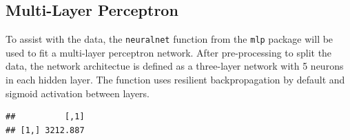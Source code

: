 
\subsection{Multi-Layer Perceptron}

To assist with the data, the \texttt{neuralnet} function from the \texttt{mlp} package will be used to fit a multi-layer perceptron network.  After pre-processing to split the data, the network architectue is defined as a three-layer network with 5 neurons in each hidden layer.  The function uses resilient backpropagation by default and sigmoid activation between layers.

\begin{Shaded}
\begin{Highlighting}[]
\NormalTok{(}\NormalTok{)}

\OtherTok{\textless{}{-}}\NormalTok{ earthquakes\_log[}\NormalTok{(}\NormalTok{(earthquakes\_log)), ]}

\OtherTok{\textless{}{-}}  \SpecialCharTok{*} 
\OtherTok{\textless{}{-}}\NormalTok{ df[}\SpecialCharTok{:}\NormalTok{train\_test\_split,]}
\OtherTok{\textless{}{-}}\NormalTok{ df[(train\_test\_split}\SpecialCharTok{+}\NormalTok{)}\SpecialCharTok{:} \NormalTok{(df),]}

\OtherTok{\textless{}{-}} \SpecialCharTok{\textasciitilde{}}
                  \NormalTok{,}
                  \NormalTok{(}\NormalTok{,}\NormalTok{))}

\OtherTok{\textless{}{-}}  \NormalTok{(} \NormalTok{))}
\SpecialCharTok{/}\SpecialCharTok{\^{}}
\end{Highlighting}
\end{Shaded}

\begin{verbatim}
##          [,1]
## [1,] 3212.887
\end{verbatim}

